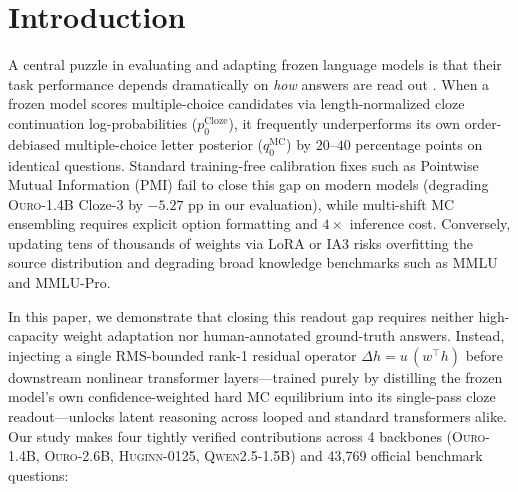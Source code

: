 \documentclass[10pt,twocolumn]{article}
\begin{document}
\begin{abstract}
Finally, cross-architecture experiments confirm that downstream depth amplification generalizes to non-recurrent \textsc{Qwen2.5-1.5B} ($+11.40$ pp Macro-4 / $+16.01$ pp Cloze-3 at Layer 14 vs.\ $+0.37$ pp at $\mathrm{lm\_head}$), that a 4,096-parameter controller at half compute ($K=2$) beats native $K=4$ by $+5.15$--$+5.58$ pp on both \textsc{Ouro-1.4B} and \textsc{Ouro-2.6B}, and that model-conditioned data value $V(D;\theta_1)\neq V(D;\theta_2)$ explains and cures \textsc{Huginn-0125}'s MMLU poisoning ($-2.13$ pp $\to$ $+2.28$ pp).
\end{abstract}

\section{Introduction}
\label{sec:intro}
A central puzzle in evaluating and adapting frozen language models is that their task performance depends dramatically on \emph{how} answers are read out \citep{holzman2021surface,zhao2021calibrate}.
When a frozen model scores multiple-choice candidates via length-normalized cloze continuation log-probabilities ($p_0^{\mathrm{Cloze}}$), it frequently underperforms its own order-debiased multiple-choice letter posterior ($q_0^{\mathrm{MC}}$) by $20$--$40$ percentage points on identical questions.
Standard training-free calibration fixes such as Pointwise Mutual Information (PMI) fail to close this gap on modern models (degrading \textsc{Ouro-1.4B} Cloze-3 by $-5.27$ pp in our evaluation), while multi-shift MC ensembling requires explicit option formatting and $4\times$ inference cost.
Conversely, updating tens of thousands of weights via LoRA \citep{hu2022lora} or IA3 \citep{liu2022fewshot} risks overfitting the source distribution and degrading broad knowledge benchmarks such as MMLU and MMLU-Pro.

In this paper, we demonstrate that closing this readout gap requires neither high-capacity weight adaptation nor human-annotated ground-truth answers.
Instead, injecting a single RMS-bounded rank-1 residual operator $\Delta h = u\,(w^\top h)$ before downstream nonlinear transformer layers---trained purely by distilling the frozen model's own confidence-weighted hard MC equilibrium into its single-pass cloze readout---unlocks latent reasoning across looped and standard transformers alike.
Our study makes four tightly verified contributions across 4 backbones (\textsc{Ouro-1.4B}, \textsc{Ouro-2.6B}, \textsc{Huginn-0125}, \textsc{Qwen2.5-1.5B}) and 43,769 official benchmark questions:
\end{document}
